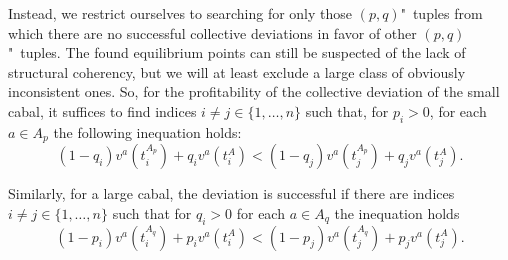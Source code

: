 Instead, we restrict ourselves to searching for only those $(p, q)$"~tuples from which there are no successful collective deviations in favor of other $(p, q)$"~tuples. The found equilibrium points can still be suspected of the lack of structural coherency, but we will at least exclude a large class of obviously inconsistent ones. So, for the profitability of the collective deviation of the small cabal, it suffices to find indices $i \neq j \in \{1, \ldots, n\}$ such that, for $p_i > 0$, for each $a \in A_p$ the following inequation holds: %
\begin{equation*}
	(1 - q_i) v^a(t_i^{A_p}) + q_i v^a(t_i^A) < (1 - q_j) v^a(t_j^{A_p}) + q_j v^a(t_j^A).
\end{equation*}

Similarly, for a large cabal, the deviation is successful if there are indices $i \neq j \in \{1, \ldots, n\}$ such that for $q_i > 0$ for each $a \in A_q$ the inequation holds %
\begin{equation*}
	(1 - p_i) v^a(t_i^{A_q}) + p_i v^a(t_i^A) < (1 - p_j) v^a(t_j^{A_q}) + p_j v^a(t_j^A).
\end{equation*}

